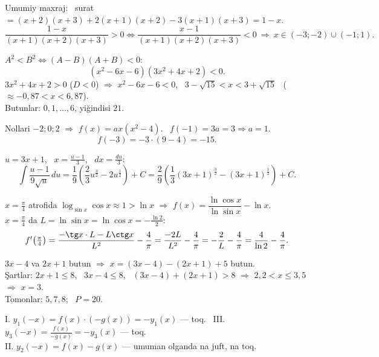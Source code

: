 Umumiy maxraj: \ surat $=(x+2)(x+3)+2(x+1)(x+2)-3(x+1)(x+3)=1-x$.
\[\frac{1-x}{(x+1)(x+2)(x+3)}>0\iff\frac{x-1}{(x+1)(x+2)(x+3)}<0\ \Rightarrow\ x\in(-3;-2)\cup(-1;1).\]

$A^2<B^2\iff(A-B)(A+B)<0$:
\[(x^2-6x-6)(3x^2+4x+2)<0.\]
$3x^2+4x+2>0$ ($D<0$) $\Rightarrow$ $x^2-6x-6<0$, \ $3-\sqrt{15}<x<3+\sqrt{15}$ \ ($\approx-0{,}87<x<6{,}87$).\\
Butunlar: $0,1,\dots,6$, yiğindisi $21$.

Nollari $-2;0;2$ $\Rightarrow$ $f(x)=ax(x^2-4)$. \ $f(-1)=3a=3\Rightarrow a=1$.
\[f(-3)=-3\cdot(9-4)=-15.\]

$u=3x+1$, \ $x=\frac{u-1}3$, \ $dx=\frac{du}3$:
\[\int\frac{u-1}{9\sqrt u}\,du=\frac19\left(\frac23u^{\frac32}-2u^{\frac12}\right)+C=\frac29\left(\frac13(3x+1)^{\frac32}-(3x+1)^{\frac12}\right)+C.\]

$x=\frac\pi4$ atrofida $\log_{\sin x}\cos x\approx1>\ln x$ $\Rightarrow$ $f(x)=\dfrac{\ln\cos x}{\ln\sin x}-\ln x$.\\
$x=\frac\pi4$ da $L=\ln\sin x=\ln\cos x=-\frac{\ln2}2$:
\[f'\!\left(\tfrac\pi4\right)=\frac{-\tg x\cdot L-L\ctg x}{L^2}-\frac4\pi=\frac{-2L}{L^2}-\frac4\pi=-\frac2L-\frac4\pi=\frac4{\ln2}-\frac4\pi.\]

$3x-4$ va $2x+1$ butun $\Rightarrow$ $x=(3x-4)-(2x+1)+5$ butun.\\
Şartlar: $2x+1\le8$, \ $3x-4\le8$, \ $(3x-4)+(2x+1)>8$ $\Rightarrow$ $2{,}2<x\le3{,}5$ $\Rightarrow$ $x=3$.\\
Tomonlar: $5,7,8$; \ $P=20$.

I. $y_1(-x)=f(x)\cdot(-g(x))=-y_1(x)$ — toq. \ III. $y_3(-x)=\frac{f(x)}{-g(x)}=-y_3(x)$ — toq.\\
II. $y_2(-x)=f(x)-g(x)$ — umuman olganda na juft, na toq.


